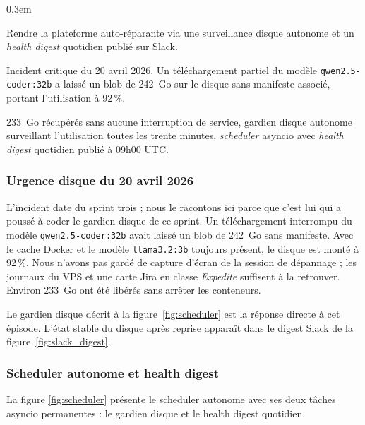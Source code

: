         \begin{description}
            \itemsep 0.3em
            \item[Objectif du sprint :] Rendre la plateforme auto-réparante via une
                surveillance disque autonome et un \textit{health digest} quotidien
                publié sur Slack.
            \item[Obstacles rencontrés :] Incident critique du 20 avril 2026. Un
                téléchargement partiel du modèle \texttt{qwen2.\allowbreak{}5-coder:32b} a laissé
                un blob de 242~Go sur le disque sans manifeste associé, portant
                l'utilisation à 92\,\%.
            \item[Livrable :] 233~Go récupérés sans aucune interruption de service,
                gardien disque autonome surveillant l'utilisation toutes les trente
                minutes, \textit{scheduler} asyncio avec \textit{health digest}
                quotidien publié à 09h00 UTC.
        \end{description}

        \subsubsection{Urgence disque du 20 avril 2026}

        L'incident date du sprint trois ; nous le racontons ici parce que c'est
        lui qui a poussé à coder le gardien disque de ce sprint. Un téléchargement
        interrompu du modèle \texttt{qwen2.\allowbreak{}5-coder:32b} avait laissé un blob de
        242~Go sans manifeste. Avec le cache Docker et le modèle
        \texttt{llama3.2:3b} toujours présent, le disque est monté à 92\,\%.
        Nous n'avons pas gardé de capture d'écran de la session de dépannage ;
        les journaux du VPS et une carte Jira en classe \textit{Expedite} suffisent
        à la retrouver. Environ 233~Go ont été libérés sans arrêter les conteneurs.

        Le gardien disque décrit à la figure~\ref{fig:scheduler} est la réponse
        directe à cet épisode. L'état stable du disque après reprise apparaît
        dans le digest Slack de la figure~\ref{fig:slack_digest}.

        \subsubsection{Scheduler autonome et health digest}

        La figure \ref{fig:scheduler} présente le scheduler autonome avec ses deux tâches
        asyncio permanentes : le gardien disque et le health digest quotidien.

